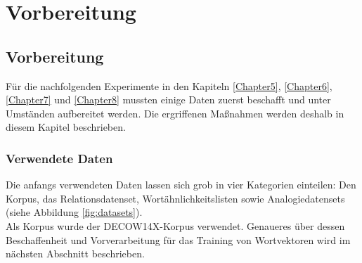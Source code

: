 
\chapter{Vorbereitung} %

\label{Chapter4} %


\section{Vorbereitung}

  Für die nachfolgenden Experimente in den Kapiteln \ref{Chapter5}, \ref{Chapter6}, \ref{Chapter7} und \ref{Chapter8}
  mussten einige Daten zuerst beschafft und unter Umständen aufbereitet werden. Die ergriffenen Maßnahmen werden
  deshalb in diesem Kapitel beschrieben.

  \subsection{Verwendete Daten}

  Die anfangs verwendeten Daten lassen sich grob in vier Kategorien einteilen: Den Korpus, das Relationsdatenset,
  Wortähnlichkeitslisten sowie Analogiedatensets (siehe Abbildung \ref{fig:datasets}).\\
  Als Korpus wurde der DECOW14X-Korpus verwendet. Genaueres über dessen Beschaffenheit und Vorverarbeitung für das
  Training von Wortvektoren wird im nächsten Abschnitt beschrieben.

